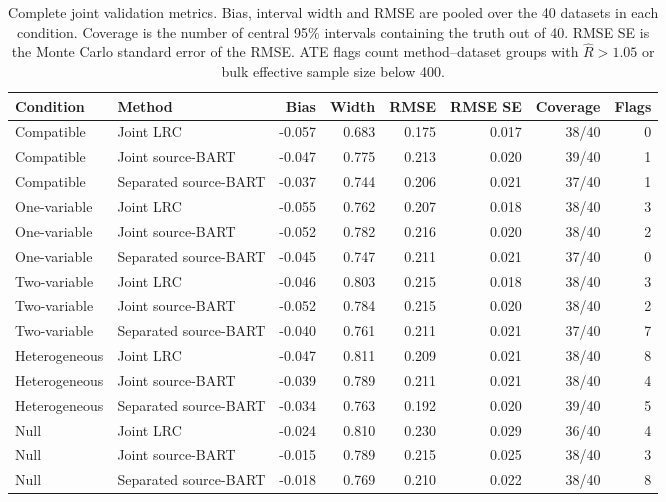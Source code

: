 \begin{table}[p]
\centering
\caption{Complete joint validation metrics. Bias, interval width and RMSE are pooled over the 40 datasets in each condition. Coverage is the number of central 95\% intervals containing the truth out of 40. RMSE SE is the Monte Carlo standard error of the RMSE. ATE flags count method--dataset groups with $\widehat R>1.05$ or bulk effective sample size below 400.}
\label{tab:joint_full_metrics}
\setlength{\tabcolsep}{2.6pt}
\scriptsize
\begin{tabular}{llrrrrrr}
\toprule
Condition & Method & Bias & Width & RMSE & RMSE SE & Coverage & Flags\\
\midrule
Compatible & Joint LRC & -0.057 & 0.683 & 0.175 & 0.017 & 38/40 & 0\\
Compatible & Joint source-BART & -0.047 & 0.775 & 0.213 & 0.020 & 39/40 & 1\\
Compatible & Separated source-BART & -0.037 & 0.744 & 0.206 & 0.021 & 37/40 & 1\\
One-variable & Joint LRC & -0.055 & 0.762 & 0.207 & 0.018 & 38/40 & 3\\
One-variable & Joint source-BART & -0.052 & 0.782 & 0.216 & 0.020 & 38/40 & 2\\
One-variable & Separated source-BART & -0.045 & 0.747 & 0.211 & 0.021 & 37/40 & 0\\
Two-variable & Joint LRC & -0.046 & 0.803 & 0.215 & 0.018 & 38/40 & 3\\
Two-variable & Joint source-BART & -0.052 & 0.784 & 0.215 & 0.020 & 38/40 & 2\\
Two-variable & Separated source-BART & -0.040 & 0.761 & 0.211 & 0.021 & 37/40 & 7\\
Heterogeneous & Joint LRC & -0.047 & 0.811 & 0.209 & 0.021 & 38/40 & 8\\
Heterogeneous & Joint source-BART & -0.039 & 0.789 & 0.211 & 0.021 & 38/40 & 4\\
Heterogeneous & Separated source-BART & -0.034 & 0.763 & 0.192 & 0.020 & 39/40 & 5\\
Null & Joint LRC & -0.024 & 0.810 & 0.230 & 0.029 & 36/40 & 4\\
Null & Joint source-BART & -0.015 & 0.789 & 0.215 & 0.025 & 38/40 & 3\\
Null & Separated source-BART & -0.018 & 0.769 & 0.210 & 0.022 & 38/40 & 8\\
\bottomrule
\end{tabular}
\end{table}

